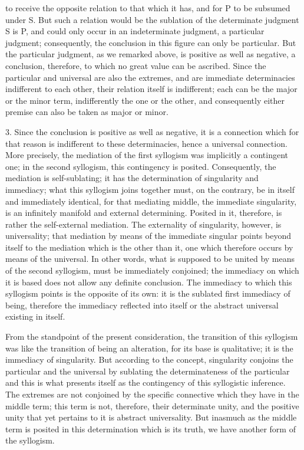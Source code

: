 to receive the opposite relation to that which it has,
and for P to be subsumed under S.
But such a relation would be the sublation of
the determinate judgment S is P,
and could only occur in an indeterminate judgment, a particular judgment;
consequently, the conclusion in this figure can only be particular.
But the particular judgment, as we remarked above,
is positive as well as negative,
a conclusion, therefore, to which no great value can be ascribed.
Since the particular and universal are also the extremes,
and are immediate determinacies indifferent to each other,
their relation itself is indifferent;
each can be the major or the minor term,
indifferently the one or the other,
and consequently either premise can also
be taken as major or minor.

3. Since the conclusion is positive as well as negative,
it is a connection which for that reason is
indifferent to these determinacies,
hence a universal connection.
More precisely, the mediation of the first syllogism
was implicitly a contingent one;
in the second syllogism, this contingency is posited.
Consequently, the mediation is self-sublating;
it has the determination of singularity and immediacy;
what this syllogism joins together must,
on the contrary, be in itself and immediately identical,
for that mediating middle, the immediate singularity,
is an infinitely manifold and external determining.
Posited in it, therefore, is rather the self-external mediation.
The externality of singularity, however, is universality;
that mediation by means of the immediate singular
points beyond itself to the mediation which is the other than it,
one which therefore occurs by means of the universal.
In other words, what is supposed to be united by means of
the second syllogism, must be immediately conjoined;
the immediacy on which it is based
does not allow any definite conclusion.
The immediacy to which this syllogism points is
the opposite of its own:
it is the sublated first immediacy of being,
therefore the immediacy reflected into itself
or the abstract universal existing in itself.

From the standpoint of the present consideration,
the transition of this syllogism was like
the transition of being an alteration,
for its base is qualitative;
it is the immediacy of singularity.
But according to the concept,
singularity conjoins the particular and the universal
by sublating the determinateness of the particular
and this is what presents itself as the contingency
of this syllogistic inference.
The extremes are not conjoined by the specific connective
which they have in the middle term;
this term is not, therefore, their determinate unity,
and the positive unity that yet pertains to it is abstract universality.
But inasmuch as the middle term is posited in this determination
which is its truth, we have another form of the syllogism.

